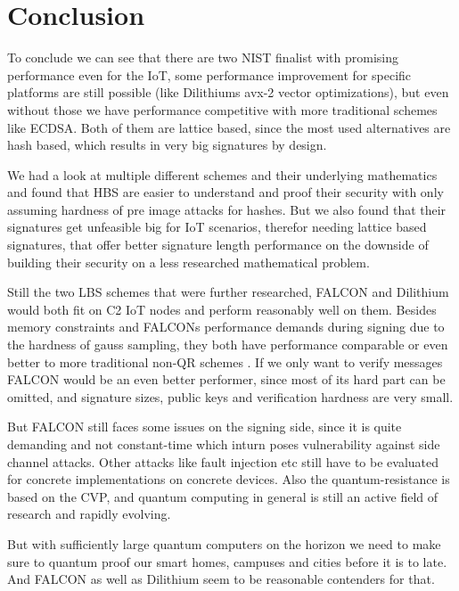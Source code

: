 \documentclass[conference]{IEEEtran}
\newcommand{\comment}[1]{}
\begin{document}

\section{Conclusion}
\comment{ %
- of course no protection against side channel etc 
- quantum fast evolving, active field of research
- smart home, smart campus, smart city
- quantum key distribution
\cite{QR_comparison}

- similar performance as traditional and also implemented in TSL variant \cite{falcon_and_dilithium}

Dilithium when signing and verification often needed
Falcon if only very since hard part is gaussian smapling which can be omitted on ver
} %

To conclude we can see that there are two NIST finalist with promising performance even for the IoT, some performance improvement for specific platforms are still possible (like Dilithiums avx-2 vector optimizations), but even without those we have performance competitive with more traditional schemes like ECDSA.
Both of them are lattice based, since the most used alternatives are hash based, which results in very big signatures by design.

We had a look at multiple different schemes and their underlying mathematics and found that HBS are easier to understand and proof their security with only assuming hardness of pre image attacks for hashes. But we also found that their signatures get unfeasible big for IoT scenarios, therefor needing lattice based signatures, that offer better signature length performance on the downside of building their security on a less researched mathematical problem.

Still the two LBS schemes that were further researched, FALCON and Dilithium would both fit on C2 IoT nodes and perform reasonably well on them.
Besides memory constraints and FALCONs performance demands during signing due to the hardness of gauss sampling, they both have performance comparable or even better to more traditional non-QR schemes \cite{falcon_and_dilithium}. If we only want to verify messages FALCON would be an even better performer, since most of its hard part can be omitted, and signature sizes, public keys and verification hardness are very small.

But FALCON still faces some issues on the signing side, since it is quite demanding and not constant-time which inturn poses vulnerability against side channel attacks.
Other attacks like fault injection etc still have to be evaluated for concrete implementations on concrete devices.
Also the quantum-resistance is based on the CVP, and quantum computing in general is still an active field of research and rapidly evolving.

But with sufficiently large quantum computers on the horizon we need to make sure to quantum proof our smart homes, campuses and cities before it is to late. And FALCON as well as Dilithium seem to be reasonable contenders for that.



\end{document}
